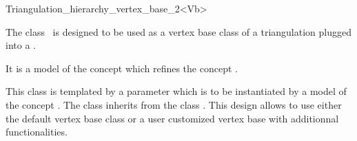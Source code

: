 

\begin{ccRefClass}{Triangulation_hierarchy_vertex_base_2<Vb>}


\ccDefinition
  
The class \ccRefName\ is designed to be used as a vertex base class
of a triangulation plugged into a
.

It is 
a model of the concept
 which refines
the concept
.

This class is templated by a parameter 
which is to be instantiated by a model of  the concept
.
The class  inherits
from the class .
This design allows to use either the default
vertex base class or a user customized
vertex base with additionnal functionalities.


\ccIsModel
{}

\ccInheritsFrom
{}


\ccSeeAlso
{} \\
 \\




\end{ccRefClass}


